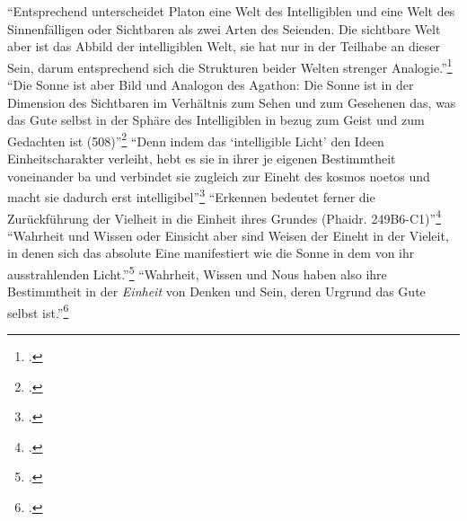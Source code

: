 \enquote{Entsprechend unterscheidet Platon eine Welt des Intelligiblen und eine Welt des Sinnenfälligen oder Sichtbaren als zwei Arten des Seienden. Die sichtbare Welt aber ist das Abbild der intelligiblen Welt, sie hat nur in der Teilhabe an dieser Sein, darum entsprechend sich die Strukturen beider Welten strenger Analogie.}\footcite[][S. 246]{halfwassenaufstieg2006}
\enquote{Die Sonne ist aber Bild und Analogon des Agathon: Die Sonne ist in der Dimension des Sichtbaren im Verhältnis zum Sehen und zum Gesehenen das, was das Gute selbst in der Sphäre des Intelligiblen in bezug zum Geist und zum Gedachten ist (508)}\footcite[][S. 250]{halfwassenaufstieg2006}
\enquote{Denn indem das \enquote{intelligible Licht} den Ideen Einheitscharakter verleiht, hebt es sie in ihrer je eigenen Bestimmtheit voneinander ba und verbindet sie zugleich zur Eineht des kosmos noetos und macht sie dadurch erst intelligibel}\footcite[][S. 252]{halfwassenaufstieg2006}
\enquote{Erkennen bedeutet ferner die Zurückführung der Vielheit in die Einheit ihres Grundes (Phaidr. 249B6-C1)}\footcite[][S. 252]{halfwassenaufstieg2006}
\enquote{Wahrheit und Wissen oder Einsicht aber sind Weisen der Eineht in der Vieleit, in denen sich das absolute Eine manifestiert wie die Sonne in dem von ihr ausstrahlenden Licht.}\footcite[][S. 252]{halfwassenaufstieg2006}
\enquote{Wahrheit, Wissen und Nous haben also ihre Bestimmtheit in der \emph{Einheit} von Denken und Sein, deren Urgrund das Gute selbst ist.}\footcite[][S. 257]{halfwassenaufstieg2006}


